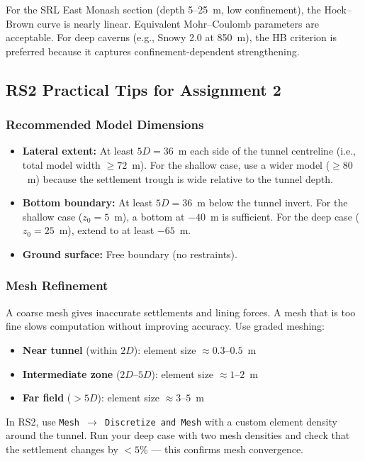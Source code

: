 \documentclass[a4paper,12pt]{article}
\begin{document}
\begin{notebox}
For the SRL East Monash section (depth 5--25~m, low confinement), the Hoek--Brown curve is nearly linear. Equivalent Mohr--Coulomb parameters are acceptable. For deep caverns (e.g., Snowy 2.0 at 850~m), the HB criterion is preferred because it captures confinement-dependent strengthening.
\end{notebox}

\subsection{RS2 Practical Tips for Assignment 2}

\subsubsection{Recommended Model Dimensions}
\begin{itemize}
    \item \textbf{Lateral extent:} At least $5D = 36$~m each side of the tunnel centreline (i.e., total model width $\geq 72$~m). For the shallow case, use a wider model ($\geq 80$~m) because the settlement trough is wide relative to the tunnel depth.
    \item \textbf{Bottom boundary:} At least $5D = 36$~m below the tunnel invert. For the shallow case ($z_0=5$~m), a bottom at $-40$~m is sufficient. For the deep case ($z_0=25$~m), extend to at least $-65$~m.
    \item \textbf{Ground surface:} Free boundary (no restraints).
\end{itemize}

\subsubsection{Mesh Refinement}

\begin{warnbox}
A coarse mesh gives inaccurate settlements and lining forces. A mesh that is too fine slows computation without improving accuracy. Use graded meshing:
\begin{itemize}[nosep]
\item \textbf{Near tunnel} (within $2D$): element size $\approx 0.3$--$0.5$~m
\item \textbf{Intermediate zone} ($2D$--$5D$): element size $\approx 1$--$2$~m
\item \textbf{Far field} ($>5D$): element size $\approx 3$--$5$~m
\end{itemize}
\vspace{0.5em}

In RS2, use \texttt{Mesh $\to$ Discretize and Mesh} with a custom element density around the tunnel. Run your deep case with two mesh densities and check that the settlement changes by $< 5\%$ --- this confirms mesh convergence.
\end{warnbox}
\end{document}
